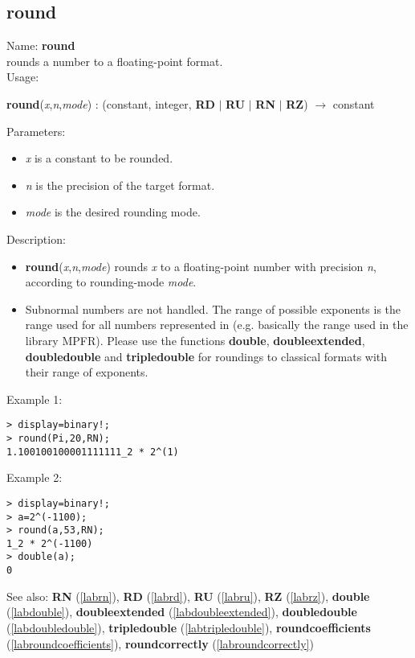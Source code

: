 \subsection{round}
\label{labround}
\noindent Name: \textbf{round}\\
rounds a number to a floating-point format.\\
\noindent Usage: 
\begin{center}
\textbf{round}(\emph{x},\emph{n},\emph{mode}) : (\textsf{constant}, \textsf{integer}, \textbf{RD} $|$ \textbf{RU} $|$ \textbf{RN} $|$ \textbf{RZ}) $\rightarrow$ \textsf{constant}
\\ 
\end{center}
Parameters: 
\begin{itemize}
\item \emph{x} is a constant to be rounded.
\item \emph{n} is the precision of the target format.
\item \emph{mode} is the desired rounding mode.
\end{itemize}
\noindent Description: \begin{itemize}

\item \textbf{round}(\emph{x},\emph{n},\emph{mode}) rounds \emph{x} to a floating-point number with 
   precision \emph{n}, according to rounding-mode \emph{mode}. 

\item Subnormal numbers are not handled. The range of possible exponents is the 
   range used for all numbers represented in \sollya (e.g. basically the range 
   used in the library MPFR). Please use the functions \textbf{double}, \textbf{doubleextended},
   \textbf{doubledouble} and \textbf{tripledouble} for roundings to classical formats with their
   range of exponents.
\end{itemize}
\noindent Example 1: 
\begin{center}\begin{minipage}{15cm}\begin{Verbatim}[frame=single]
> display=binary!;
> round(Pi,20,RN);
1.100100100001111111_2 * 2^(1)
\end{Verbatim}
\end{minipage}\end{center}
\noindent Example 2: 
\begin{center}\begin{minipage}{15cm}\begin{Verbatim}[frame=single]
> display=binary!;
> a=2^(-1100);
> round(a,53,RN);
1_2 * 2^(-1100)
> double(a);
0
\end{Verbatim}
\end{minipage}\end{center}
See also: \textbf{RN} (\ref{labrn}), \textbf{RD} (\ref{labrd}), \textbf{RU} (\ref{labru}), \textbf{RZ} (\ref{labrz}), \textbf{double} (\ref{labdouble}), \textbf{doubleextended} (\ref{labdoubleextended}), \textbf{doubledouble} (\ref{labdoubledouble}), \textbf{tripledouble} (\ref{labtripledouble}), \textbf{roundcoefficients} (\ref{labroundcoefficients}), \textbf{roundcorrectly} (\ref{labroundcorrectly})
